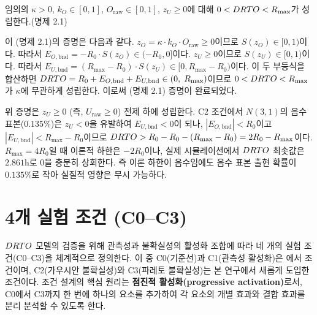 \label{prop:boundary}%
임의의 $\kappa > 0$, $k_O \in [0, 1]$, $O_{\text{raw}} \in [0, 1]$,
$z_U \geq 0$에 대해 $0 < DRTO < R_{\max}$가 성립한다.(명제 2.1)

이 (명제 2.1)의 증명은 다음과 같다.
$z_O = \kappa \cdot k_O \cdot O_{\text{raw}} \geq 0$이므로
$S(z_O) \in [0, 1)$이다. 따라서
$E_{O,\text{bnd}} = -R_0 \cdot S(z_O) \in (-R_0, 0]$이다.
$z_U \geq 0$이므로
$S(z_U) \in [0, 1)$이다. 따라서
$E_{U,\text{bnd}} = (R_{\max} - R_0) \cdot S(z_U) \in [0, R_{\max} - R_0)$이다.
이 두 부등식을 합산하면 $DRTO = R_0 + E_{O,\text{bnd}} + E_{U,\text{bnd}} \in (0,\; R_{\max})$이므로
$0 < DRTO < R_{\max}$가 $\kappa$에 무관하게 성립한다. 이로써 (명제 2.1) 증명이 완료되었다.

위 증명은 $z_U \geq 0$ (즉, $U_{\text{raw}} \geq 0$) 전제 하에 성립한다.
C2 조건에서 $N(3,1)$의 음수 표본($0.135\%$)은 $z_U < 0$을 유발하여
$E_{U,\text{bnd}} < 0$이 되나,
$|E_{O,\text{bnd}}| < R_0$이고 $|E_{U,\text{bnd}}| < R_{\max} - R_0$이므로
$DRTO > R_0 - R_0 - (R_{\max} - R_0) = 2R_0 - R_{\max}$이다.
$R_{\max} = 4R_0$일 때 이론적 하한은 $-2R_0$이나,
실제 시뮬레이션에서 $DRTO$ 최솟값은 $2.861$h로 $0$을 충분히 상회한다.
즉 이론 하한이 음수임에도 음수 표본 출현 확률이 $0.135\%$로 작아 실질적 영향은 무시 가능하다.

\medskip
{}


\section{4개 실험 조건 (C0--C3)}
\label{sec:conditions}

$DRTO$ 모델의 검증을 위해 관측성과 불확실성의 활성화 조합에 따라
네 개의 실험 조건(C0--C3)을 체계적으로 정의한다.
이 중 C0(기준선)과 C1(관측성 활성화)은 \citet{lee2026drto}에서
 조건이며, C2(가우시안 불확실성)와 C3(파레토 불확실성)는
본 연구에서 새롭게 도입한 조건이다.
조건 설계의 핵심 원리는 \textbf{점진적 활성화(progressive activation)}로서,
C0에서 C3까지 한 번에 하나의 요소를 추가하여 각 요소의 개별 효과와
결합 효과를 분리 분석할 수 있도록 한다.

